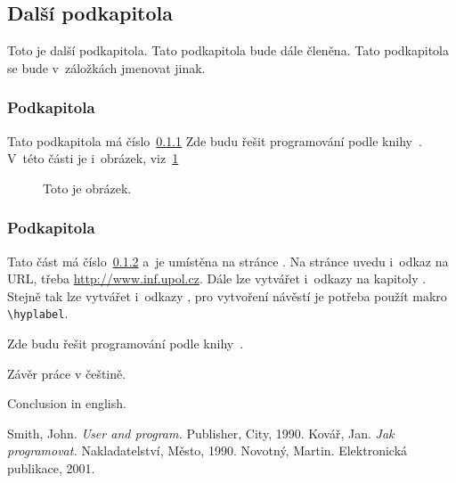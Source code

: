 \documentclass[12pt]{article}
\begin{document}
\subsection{Další podkapitola}
Toto je další podkapitola. Tato podkapitola bude dále členěna.
Tato podkapitola se bude v~záložkách jmenovat jinak.

\subsubsection{Podkapitola}\label{podkapX}
Tato podkapitola má číslo~\ref{podkapX}
Zde budu řešit programování podle knihy~\cite{kovar}.
V~této části je i~obrázek, viz~\ref{obr}

\begin{figure}[ht]
  \centerline{}
  \caption{Toto je obrázek.} \label{obr}
\end{figure}

\subsubsection{Podkapitola}\label{podkapY}
Tato část má číslo~\ref{podkapY} a~je umístěna na stránce \pageref{podkapY}.
Na stránce uvedu i~odkaz na URL, třeba \url{http://www.inf.upol.cz}.
Dále lze vytvářet i~odkazy na kapitoly .
Stejně tak lze vytvářet i~odkazy ,
pro vytvoření návěstí je potřeba použít makro \verb|\hyplabel|.

\medskip
Zde budu řešit programování podle knihy~\cite{kovar}.


\begin{conclusions-cz}
  Závěr práce v češtině.
\end{conclusions-cz}


\begin{conclusions-en}
  Conclusion in english.
\end{conclusions-en}


\newpage
\begin{thebibliography}{99}

 Smith, John. \emph{User and program.}
                Publisher, City, 1990.
 Kovář, Jan. \emph{Jak programovat.}
                Nakladatelství, Město, 1990.
 Novotný, Martin.
                Elektronická publikace, 2001.

\end{thebibliography}
\end{document}
